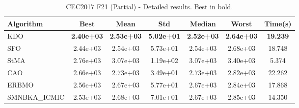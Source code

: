 \begin{table}[H]
\centering\small
\caption{CEC2017 F21 (Partial) - Detailed results. Best in bold.}
\label{tab:cec2017_F21}
\begin{tabular}{lcccccc}
\toprule
\textbf{Algorithm} & \textbf{Best} & \textbf{Mean} & \textbf{Std} & \textbf{Median} & \textbf{Worst} & \textbf{Time(s)} \\
\midrule
KDO & \textbf{2.40e+03} & \textbf{2.53e+03} & \textbf{5.02e+01} & \textbf{2.52e+03} & \textbf{2.64e+03} & \textbf{19.239} \\
SFO & 2.44e+03 & 2.54e+03 & 5.73e+01 & 2.54e+03 & 2.68e+03 & 18.748 \\
StMA & 2.76e+03 & 3.07e+03 & 1.19e+02 & 3.07e+03 & 3.40e+03 & 5.374 \\
CAO & 2.66e+03 & 2.73e+03 & 3.49e+01 & 2.73e+03 & 2.82e+03 & 22.262 \\
ERBMO & 2.56e+03 & 2.67e+03 & 5.77e+01 & 2.67e+03 & 2.84e+03 & 17.868 \\
SMNBKA_ICMIC & 2.53e+03 & 2.68e+03 & 7.01e+01 & 2.67e+03 & 2.85e+03 & 14.350 \\
\bottomrule
\end{tabular}
\end{table}

